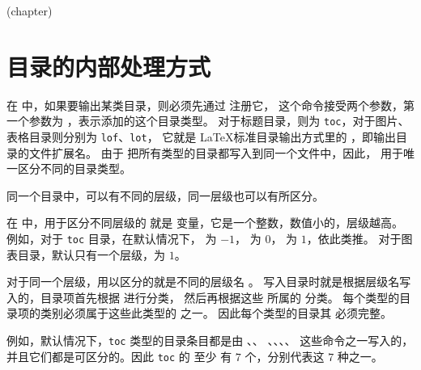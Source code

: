 \documentclass{cusdoc}
\begin{document}
\begin{xample}
\begingroup 
{}
  {}{\startmulticolumns[ragged,outer-sep=0pt,
      heading={{\centering\Large\bfseries\tocthetitle\par}}]}
  {}
  {\stopmulticolumns}{}
  {\begin{description}}
  {}
  {\tocifcomplement{\item[\rule{1ex}{1ex}]\rule{1ex}{1ex}\par}
    {\item[\tocifnamed{\tocthename}{\rule{1ex}{1ex}}]
      \tocthetitle\quad\toclink{\tocthepage}\par}}
  {}
  {\end{description}}
\localspecifiedtoc(chapter)
\endgroup
\stopxamplecode
\xampleprint
\end{xample}


\section{目录的内部处理方式}

在 \CusTeX 中，如果要输出某类目录，则必须先通过  注册它，
这个命令接受两个参数，第一个参数为 ，表示添加的这个目录类型。
对于标题目录，则为 \texttt{toc}，对于图片、表格目录则分别为 \texttt{lof}、\texttt{lot}，
它就是 \LaTeX 标准目录输出方式里的 ，即输出目录的文件扩展名。
由于 \CusTeX 把所有类型的目录都写入到同一个文件中，因此， 
用于唯一区分不同的目录类型。

同一个目录中，可以有不同的层级，同一层级也可以有所区分。

在 \CusTeX 中，用于区分不同层级的
就是  变量，它是一个整数，数值小的，层级越高。
例如，对于 \texttt{toc} 目录，在默认情况下， 为 $-1$， 为 $0$，
 为 $1$，依此类推。
对于图表目录，默认只有一个层级，为 $1$。

对于同一个层级，用以区分的就是不同的层级名 。
写入目录时就是根据层级名写入的，目录项首先根据  进行分类，
然后再根据这些  所属的  分类。
每个类型的目录项的类别必须属于这些此类型的  之一。
因此每个类型的目录其  必须完整。

例如，默认情况下，\texttt{toc} 类型的目录条目都是由 、、
、、、、 
这些命令之一写入的，并且它们都是可区分的。因此 \texttt{toc} 的  至少
有 $7$ 个，分别代表这 $7$ 种之一。
\end{document}
